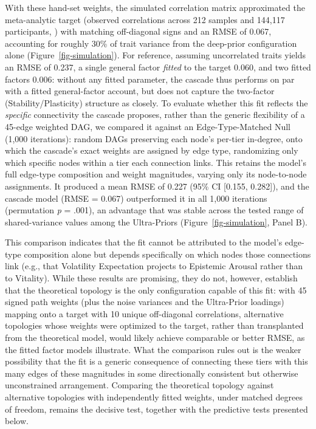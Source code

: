 \documentclass[
  jou,
  floatsintext,
  longtable,
  nolmodern,
  notxfonts,
  notimes,
  12pt,
  colorlinks=true,linkcolor=blue,citecolor=blue,urlcolor=blue]{apa7}
\begin{document}
With these hand-set weights, the simulated correlation matrix
approximated the meta-analytic target (observed correlations across 212
samples and 144,117 participants,
)
with matching off-diagonal signs and an RMSE of 0.067, accounting for
roughly 30\% of trait variance from the deep-prior configuration alone
(Figure~\ref{fig-simulation}). For reference, assuming uncorrelated
traits yields an RMSE of 0.237, a single general factor \emph{fitted} to
the target 0.060, and two fitted factors 0.006: without any fitted
parameter, the cascade thus performs on par with a fitted general-factor
account, but does not capture the two-factor (Stability/Plasticity)
structure as closely. To evaluate whether this fit reflects the
\emph{specific} connectivity the cascade proposes, rather than the
generic flexibility of a 45-edge weighted DAG, we compared it against an
Edge-Type-Matched Null (1,000 iterations): random DAGs preserving each
node's per-tier in-degree, onto which the cascade's exact weights are
assigned by edge type, randomizing only which specific nodes within a
tier each connection links. This retains the model's full edge-type
composition and weight magnitudes, varying only its node-to-node
assignments. It produced a mean RMSE of 0.227 (95\% CI {[}0.155,
0.282{]}), and the cascade model (RMSE = 0.067) outperformed it in all
1,000 iterations (permutation \emph{p} = .001), an advantage that was
stable across the tested range of shared-variance values among the
Ultra-Priors (Figure~\ref{fig-simulation}, Panel B).

This comparison indicates that the fit cannot be attributed to the
model's edge-type composition alone but depends specifically on which
nodes those connections link (e.g., that Volatility Expectation projects
to Epistemic Arousal rather than to Vitality). While these results are
promising, they do not, however, establish that the theoretical topology
is the only configuration capable of this fit: with 45 signed path
weights (plus the noise variances and the Ultra-Prior loadings) mapping
onto a target with 10 unique off-diagonal correlations, alternative
topologies whose weights were optimized to the target, rather than
transplanted from the theoretical model, would likely achieve comparable
or better RMSE, as the fitted factor models illustrate. What the
comparison rules out is the weaker possibility that the fit is a generic
consequence of connecting these tiers with this many edges of these
magnitudes in some directionally consistent but otherwise unconstrained
arrangement. Comparing the theoretical topology against alternative
topologies with independently fitted weights, under matched degrees of
freedom, remains the decisive test, together with the predictive tests
presented below.
\end{document}
